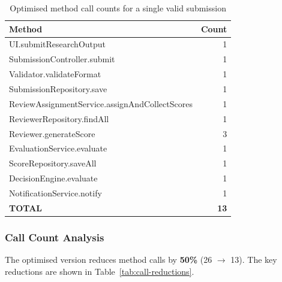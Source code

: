 \documentclass[12pt, a4paper]{article}
\begin{document}
\begin{table}[h]
\centering
\caption{Optimised method call counts for a single valid submission}
\label{tab:optimised-calls}
\begin{tabular}{l r}
    \toprule
    \textbf{Method} & \textbf{Count} \\
    \midrule
    UI.submitResearchOutput & 1 \\
    SubmissionController.submit & 1 \\
    Validator.validateFormat & 1 \\
    SubmissionRepository.save & 1 \\
    ReviewAssignmentService.assignAndCollectScores & 1 \\
    ReviewerRepository.findAll & 1 \\
    Reviewer.generateScore & 3 \\
    EvaluationService.evaluate & 1 \\
    ScoreRepository.saveAll & 1 \\
    DecisionEngine.evaluate & 1 \\
    NotificationService.notify & 1 \\
    \midrule
    \textbf{TOTAL} & \textbf{13} \\
    \bottomrule
\end{tabular}
\end{table}

\subsubsection{Call Count Analysis}

The optimised version reduces method calls by \textbf{50\%} (26 $\rightarrow$ 13). The key reductions are shown in Table~\ref{tab:call-reductions}.
\end{document}
